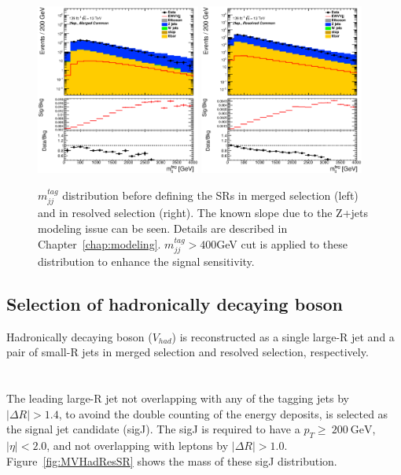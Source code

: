 \begin{figure}[ht]
    \centering
    \includegraphics[width=0.48\textwidth]{figures/2lep/dataMC/C_0ptag1pfat0pjet_0ptv_MergedCommon_MTagMerJets_Log}
    \includegraphics[width=0.48\textwidth]{figures/2lep/dataMC/C_0ptag2pjet_0ptv_ResolvedCommon_MTagResJets_Log} 
    \caption{$m^{tag}_{jj}$ distribution before defining the SRs in merged selection (left) and in resolved selection (right). The known slope due to the Z+jets modeling issue can be seen. Details are described in Chapter~\ref{chap:modeling}. $m^{tag}_{jj} > 400$GeV cut is applied to these distribution to enhance the signal sensitivity.}
    \label{fig:Mtagjj}
\end{figure}

\subsection{Selection of hadronically decaying boson}
Hadronically decaying boson ($V_{had}$) is reconstructed as a single large-R jet and a pair of small-R jets in merged selection and resolved selection, respectively. \\ \\
\noindent\textbf{}  \\
The leading large-R jet not overlapping with any of the tagging jets by $|\Delta R|>1.4$, to avoind the double counting of the energy deposits, is selected as the signal jet candidate (sigJ).
The sigJ is required to have a $p_{T} \geq ~200~\mathrm{GeV}$, $|\eta| < 2.0$, and not overlapping with leptons by $|\Delta R|>1.0$.
Figure~\ref{fig:MVHadResSR} shows the mass of these sigJ distribution.

